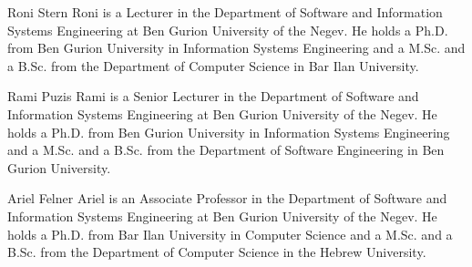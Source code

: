 \documentclass[journal]{IEEEtran}
\begin{document}

\begin{IEEEbiographynophoto}{Roni Stern}
Roni is a Lecturer in the Department of Software and Information Systems Engineering at Ben Gurion University of the Negev.
He holds a Ph.D. from Ben Gurion University in Information Systems Engineering and a M.Sc. and a B.Sc. from the Department of Computer Science in Bar Ilan University.
\end{IEEEbiographynophoto}

\begin{IEEEbiographynophoto}{Rami Puzis}
Rami is a Senior Lecturer in the Department of Software and Information Systems Engineering at Ben Gurion University of the Negev.
He holds a Ph.D. from Ben Gurion University in Information Systems Engineering and a M.Sc. and a B.Sc. from the Department of Software Engineering in Ben Gurion University.
\end{IEEEbiographynophoto}

\begin{IEEEbiographynophoto}{Ariel Felner}
Ariel is an Associate Professor in the Department of Software and Information Systems Engineering at Ben Gurion University of the Negev.
He holds a Ph.D. from Bar Ilan University in Computer Science and a M.Sc. and a B.Sc. from the Department of Computer Science in the Hebrew University.
\end{IEEEbiographynophoto}






\end{document}
